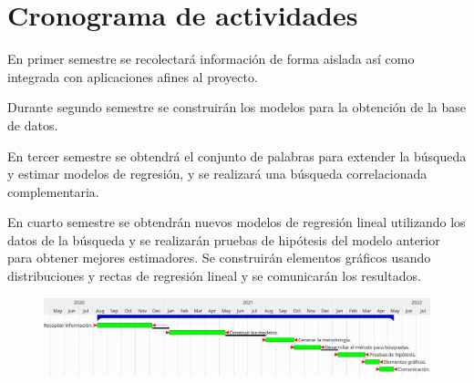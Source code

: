\section {Cronograma de actividades}
En primer semestre se recolectará información de forma aislada así como integrada con aplicaciones afines al proyecto.

Durante segundo semestre se construirán los modelos para la obtención de la base de datos.

En tercer semestre se obtendrá el conjunto de palabras para extender la búsqueda y estimar modelos de regresión, y se realizará una búsqueda correlacionada complementaria.

En cuarto semestre se obtendrán nuevos modelos de regresión lineal utilizando los datos de la búsqueda y se realizarán pruebas de hipótesis del modelo anterior para obtener mejores estimadores. Se construirán elementos gráficos usando distribuciones y rectas de regresión lineal y se comunicarán los resultados.
\begin{figure}[H]\centering\includegraphics[width=.95\linewidth]{gantt.png}\end{figure}